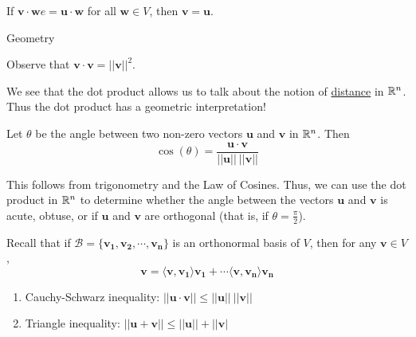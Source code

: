     
    \begin{corollary}
    If $ \bm{v} \cdot \bm{w} e = \bm{u} \cdot \bm{w}$ for all $\bm{w} \in V$, then $\bm{v} = \bm{u}$.
    \end{corollary}


Geometry


\begin{proposition}
    Observe that $\bm{v} \cdot \bm{v} = ||\bm{v}||^2$. 
\end{proposition}
    
    We see that the dot product allows us to talk about the notion of \underline{distance} in $\mathbb{R}^n$.  Thus the dot product has a geometric interpretation!
    



\begin{proposition}\label{geometricdotproduct}
    Let $\theta$ be the angle between two non-zero vectors $\bm{u}$ and $\bm{v}$ in $\mathbb{R}^n$.  Then  $$\cos(\theta) = \frac{\bm{u} \cdot \bm{v}}{||\bm{u}|| \ ||\bm{v}||}$$
    \end{proposition}

This follows from trigonometry and the Law of Cosines.  Thus, we can use the dot product in $\mathbb{R}^n$ to determine whether the angle between the vectors $\bm{u}$ and $\bm{v}$ is acute, obtuse, or if $\bm{u}$ and $\bm{v}$ are orthogonal (that is, if $\theta = \frac{\pi}{2}$).




\begin{proposition}\label{coeffdotprod}
    Recall that if $\mathscr{B} = \{\bm{v_1}, \bm{v_2}, \cdots, \bm{v_n}\}$ is an orthonormal basis of $V$, then for any $\bm{v} \in V$, $$\bm{v} = \langle \bm{v}, \bm{v_1} \rangle \bm{v_1} + \cdots \langle \bm{v}, \bm{v_n} \rangle \bm{v_n}$$ 
    \end{proposition}


\begin{theorem}
    
    \begin{enumerate}
        \item Cauchy-Schwarz inequality: $|| \bm{u} \cdot \bm{v} || \leq  || \bm{u}|| \ || \bm{v} ||$
        \item Triangle inequality: $|| \bm{u}+ \bm{v} || \leq  || \bm{u}|| +|| \bm{v} |$
    \end{enumerate}
    
    \end{theorem}

